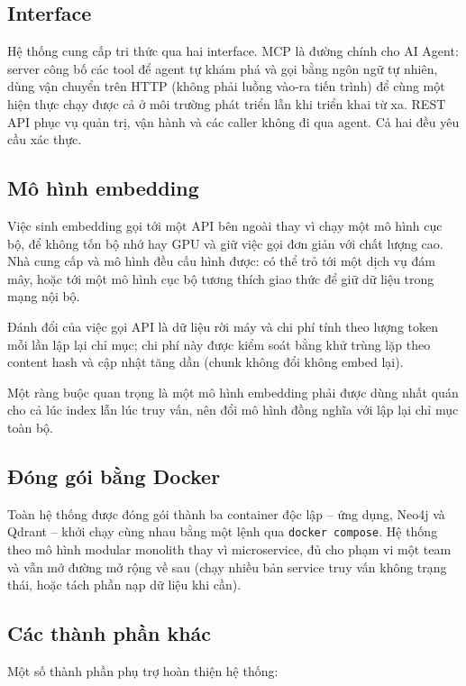 \subsection{Interface}

Hệ thống cung cấp tri thức qua hai interface. MCP là đường chính cho AI Agent: server công bố các tool để agent tự khám phá và gọi bằng ngôn ngữ tự nhiên, dùng vận chuyển trên HTTP (không phải luồng vào-ra tiến trình) để cùng một hiện thực chạy được cả ở môi trường phát triển lẫn khi triển khai từ xa. REST API phục vụ quản trị, vận hành và các caller không đi qua agent. Cả hai đều yêu cầu xác thực.

\subsection{Mô hình embedding}

Việc sinh embedding gọi tới một API bên ngoài thay vì chạy một mô hình cục bộ, để không tốn bộ nhớ hay GPU và giữ việc gọi đơn giản với chất lượng cao. Nhà cung cấp và mô hình đều cấu hình được: có thể trỏ tới một dịch vụ đám mây, hoặc tới một mô hình cục bộ tương thích giao thức để giữ dữ liệu trong mạng nội bộ. 

Đánh đổi của việc gọi API là dữ liệu rời máy và chi phí tính theo lượng token mỗi lần lập lại chỉ mục; chi phí này được kiểm soát bằng khử trùng lặp theo content hash và cập nhật tăng dần (chunk không đổi không embed lại). 

Một ràng buộc quan trọng là một mô hình embedding phải được dùng nhất quán cho cả lúc index lẫn lúc truy vấn, nên đổi mô hình đồng nghĩa với lập lại chỉ mục toàn bộ.

\subsection{Đóng gói bằng Docker}

Toàn hệ thống được đóng gói thành ba container độc lập -- ứng dụng, Neo4j và Qdrant -- khởi chạy cùng nhau bằng một lệnh qua \texttt{docker compose}. Hệ thống theo mô hình modular monolith thay vì microservice, đủ cho phạm vi một team và vẫn mở đường mở rộng về sau (chạy nhiều bản service truy vấn không trạng thái, hoặc tách phần nạp dữ liệu khi cần).

\subsection{Các thành phần khác}

Một số thành phần phụ trợ hoàn thiện hệ thống:

